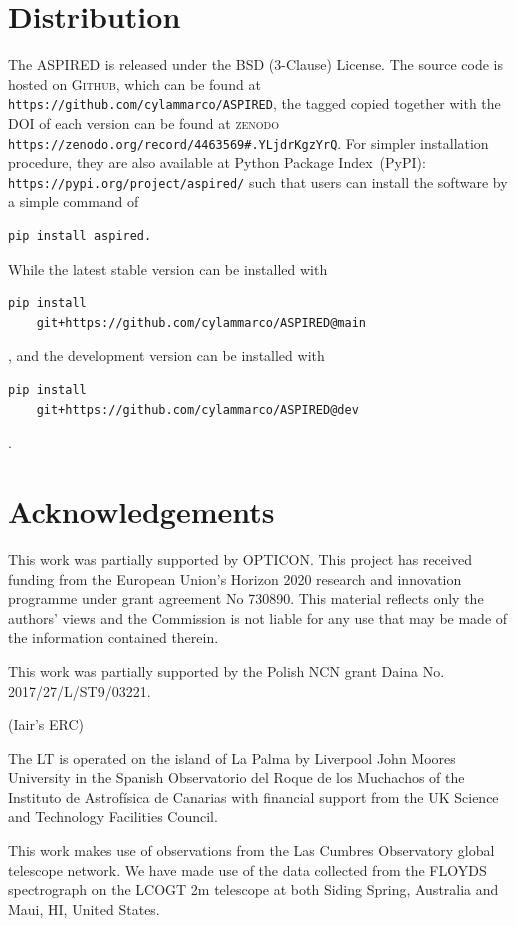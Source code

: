 \documentclass[fleqn,usenatbib]{mnras}
\begin{document}
\section{Distribution}
The \textsc{ASPIRED} is released under the BSD (3-Clause) License. The
source code is hosted on \textsc{Github}, which can be found at
\verb+https://github.com/cylammarco/ASPIRED+, the tagged copied together
with the DOI of each version can be found at
\textsc{zenodo} \verb+https://zenodo.org/record/4463569#.YLjdrKgzYrQ+.
For simpler installation procedure, they are also available at Python
Package Index~(PyPI): \verb+https://pypi.org/project/aspired/+ such that
users can install the software by a simple command of 
\begin{verbatim}
pip install aspired.
\end{verbatim}
While the latest stable version can be installed with
\begin{verbatim}
pip install 
    git+https://github.com/cylammarco/ASPIRED@main
\end{verbatim},
and the development version can be installed with 
\begin{verbatim}
pip install 
    git+https://github.com/cylammarco/ASPIRED@dev
\end{verbatim}.

\section*{Acknowledgements}
This work was partially supported by OPTICON. This project has
received funding from the European Union’s Horizon 2020 research and
innovation programme under grant agreement No 730890. This material
reflects only the authors' views and the Commission is not liable for
any use that may be made of the information contained therein.

This work was partially supported by the Polish NCN grant Daina
No. 2017/27/L/ST9/03221.

(Iair's ERC)

The LT is operated on the island of La Palma by Liverpool
John Moores University in the Spanish Observatorio del Roque
de los Muchachos of the Instituto de Astrof{\'i}sica de Canarias with
financial support from the UK Science and Technology Facilities
Council.

This work makes use of observations from the Las Cumbres Observatory
global telescope network. We have made use of the data collected from
the FLOYDS spectrograph on the LCOGT 2m telescope at both Siding Spring,
Australia and Maui, HI, United States.
\end{document}
